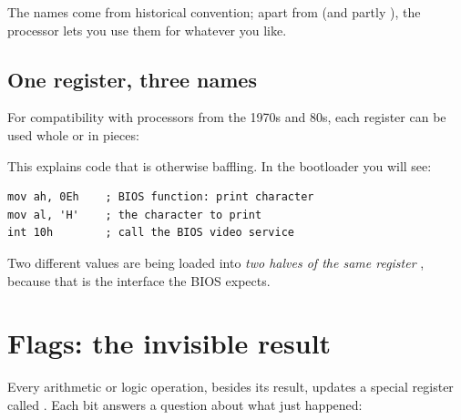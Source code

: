 The names come from historical convention; apart from  (and partly ), the
processor lets you use them for whatever you like.

\subsection{One register, three names}

For compatibility with processors from the 1970s and 80s, each register can be used whole or in
pieces:

\begin{center}
\end{center}

This explains code that is otherwise baffling. In the bootloader you will see:

\begin{lstlisting}[style=asm]
mov ah, 0Eh    ; BIOS function: print character
mov al, 'H'    ; the character to print
int 10h        ; call the BIOS video service
\end{lstlisting}

Two different values are being loaded into \emph{two halves of the same register} ,
because that is the interface the BIOS expects.

\section{Flags: the invisible result}

Every arithmetic or logic operation, besides its result, updates a special register called
. Each bit answers a question about what just happened:

